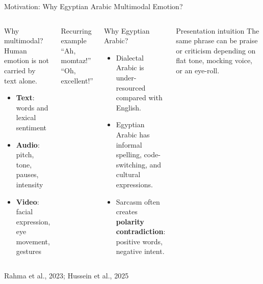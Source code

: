 \documentclass[aspectratio=169,10pt]{beamer}
\newcommand{\term}[1]{\textbf{\textcolor{MidBlue}{#1}}}
\newcommand{\muted}[1]{\textcolor{MutedGray}{#1}}
\newcommand{\source}[1]{\vspace{0.05cm}\hfill{\scriptsize\textcolor{MutedGray}{#1}}}
\begin{document}
\begin{frame}[t]{Motivation: Why Egyptian Arabic Multimodal Emotion?}
\begin{columns}[T,onlytextwidth]
\begin{block}{Why multimodal?}
Human emotion is not carried by text alone.
\vspace{0.25em}
\begin{itemize}
  \item \term{Text}: words and lexical sentiment
  \item \term{Audio}: pitch, tone, pauses, intensity
  \item \term{Video}: facial expression, eye movement, gestures
\end{itemize}
\end{block}
\begin{alertblock}{Recurring example}
\centering
\Large ``Ah, momtaz!''\\[-0.1cm]
\normalsize\muted{``Oh, excellent!''}
\end{alertblock}
\begin{block}{Why Egyptian Arabic?}
\begin{itemize}
  \item Dialectal Arabic is under-resourced compared with English.
  \item Egyptian Arabic has informal spelling, code-switching, and cultural expressions.
  \item Sarcasm often creates \term{polarity contradiction}: positive words, negative intent.
\end{itemize}
\end{block}
\begin{exampleblock}{Presentation intuition}
The same phrase can be praise or criticism depending on flat tone, mocking voice, or an eye-roll.
\end{exampleblock}
\end{columns}
\source{Rahma et al., 2023; Hussein et al., 2025}
\end{frame}
\end{document}
